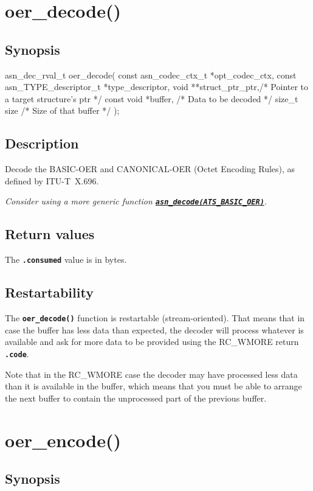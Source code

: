 \documentclass[english,oneside,12pt]{book}
\newcommand{\apisection}[2]{\clearpage\section{\label{#1}#2}}
\newcommand{\api}[2]{\hyperref[#1]{\code{#2}}}
\newcommand{\code}[1]{\texttt{\textbf{\lstinline{#1}}}}
\begin{document}
\apisection{sec:oer_decode}{oer\_decode()}

\subsection*{Synopsis}
\begin{signature}
asn_dec_rval_t oer_decode(
    const asn_codec_ctx_t *opt_codec_ctx,
    const asn_TYPE_descriptor_t *type_descriptor,
    void **struct_ptr_ptr,/* Pointer to a target structure's ptr */
    const void *buffer,   /* Data to be decoded */
    size_t size           /* Size of that buffer */
);
\end{signature}

\subsection*{Description}

Decode the BASIC-OER and CANONICAL-OER (Octet Encoding Rules),
as defined by ITU-T~X.696.\newline

\noindent\emph{Consider using a more generic function \api{sec:asn_decode}{asn_decode(ATS_BASIC_OER)}.}

\subsection*{Return values}


The \code{.consumed} value is in bytes.

\subsection*{Restartability}

The \code{oer_decode()} function is restartable (stream-oriented).
That means that in case the buffer has less data than expected,
the decoder will process whatever is available and ask for more data
to be provided using the RC\_WMORE return \code{.code}.

Note that in the RC\_WMORE case the decoder may have processed less data than
it is available in the buffer, which means that you must be able to arrange
the next buffer to contain the unprocessed part of the previous buffer.

\apisection{sec:oer_encode}{oer\_encode()}

\subsection*{Synopsis}
\end{document}
